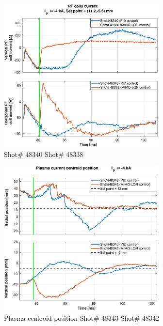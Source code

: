 \begin{figure}
	\centering
	\includegraphics[width=0.75\textwidth]{Chp5/PIDvsMIMO_340_338_curr_2.eps}
	\caption{ Shot\# 48340 Shot\# 48338}
\end{figure}

\begin{figure}
	\centering
	\includegraphics[width=0.75\textwidth]{Chp5/PIDvsMIMO_343_342_2.eps}
	\caption{Plasma centroid position Shot\# 48343 Shot\# 48342}
\end{figure}

